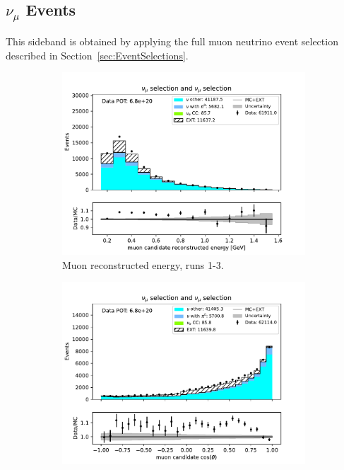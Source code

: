 \subsection{$\nu_{\mu}$ Events}
\label{sec:NuMuSideband}

This sideband is obtained by applying the full muon neutrino event selection described in Section~\ref{sec:EventSelections}.

\begin{figure}[H]
    \centering
    \begin{subfigure}{0.33\linewidth}
        \captionsetup{width=0.7\linewidth}
        \includegraphics[width=\linewidth]{technote/Sidebands/Figures/NuMuSideband/muon_sideband_muon_energy_run123_NUMU_NUMU.pdf}
        \caption{Muon reconstructed energy, runs 1-3.}
    \end{subfigure}%
    \begin{subfigure}{0.33\linewidth}
        \captionsetup{width=0.6\linewidth}
        \includegraphics[width=\linewidth]{technote/Sidebands/Figures/NuMuSideband/muon_sideband_muon_theta_run123_NUMU_NUMU.pdf}

\end{subfigure}
\end{figure}

